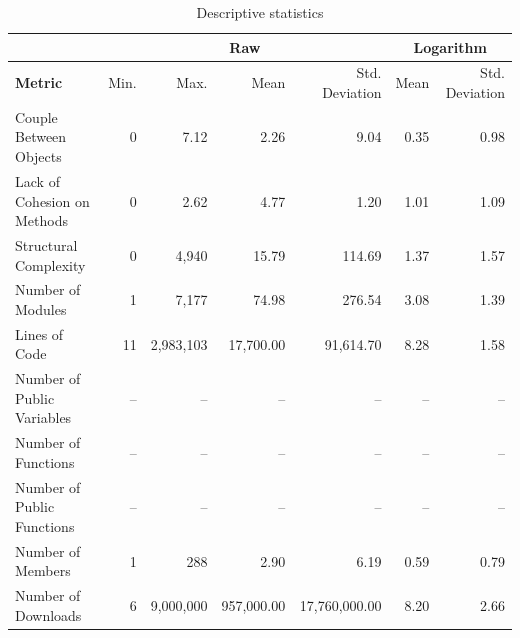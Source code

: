 \documentclass[conference]{IEEEtran}
\begin{document}
\begin{center}
\begin{table}[hbt]
\centering \caption{Descriptive statistics}
\begin{tabular}{|l|r|r|r|r|r|r|} \hline
  & \multicolumn{4}{|c|}{Raw} & \multicolumn{2}{|c|}{Logarithm}\\ \hline

\textbf{Metric} 	    & Min. & Max. & Mean & Std. Deviation & Mean & Std. Deviation \\ \hline

Couple Between Objects      & 0 & 7.12 & 2.26 & 9.04 & 0.35 & 0.98 \\ \hline

Lack of Cohesion on Methods & 0 & 2.62 & 4.77 & 1.20 & 1.01 & 1.09 \\ \hline

Structural Complexity       & 0 & 4,940 & 15.79 & 114.69 & 1.37 & 1.57 \\ \hline

Number of Modules           & 1 & 7,177 & 74.98 & 276.54 & 3.08 & 1.39 \\ \hline

Lines of Code               & 11 & 2,983,103 & 17,700.00 & 91,614.70 & 8.28 & 1.58 \\ \hline

Number of Public Variables  & -- & -- & -- & -- & -- & -- \\ \hline

Number of Functions	    & -- & -- & -- & -- & -- & -- \\ \hline

Number of Public Functions  & -- & -- & -- & -- & -- & -- \\ \hline

Number of Members           & 1 & 288 & 2.90 & 6.19 & 0.59 & 0.79 \\ \hline

Number of Downloads         & 6 & 9,000,000 & 957,000.00 & 17,760,000.00 & 8.20 & 2.66 \\ \hline

\end{tabular}
\label{table:statistics}
\end{table}
\end{center}
\end{document}
